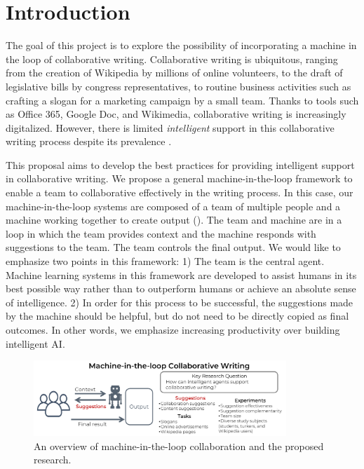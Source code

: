 
\section{Introduction}

The goal of this project is to explore the possibility of incorporating a machine in the loop of collaborative writing.
Collaborative writing is ubiquitous, ranging from the creation of Wikipedia by millions of online volunteers, to the draft of legislative bills by congress representatives, to routine business activities such as crafting a slogan for a marketing campaign by a small team.
Thanks to tools such as Office 365, Google Doc, and Wikimedia, collaborative writing is increasingly digitalized.
However, there is limited {\em intelligent} support in this collaborative writing process despite its prevalence \citep{gehrmann2015deploying}.


This proposal aims to develop the best practices for providing intelligent support in collaborative writing.
We propose a general machine-in-the-loop framework to enable a team to collaborative effectively in the writing process.
In this case, our machine-in-the-loop systems are composed of a team of multiple people and a machine working together to create output (). The team and machine are in a loop in which the team provides context and the machine responds with suggestions to the team. The team controls the final output.
We would like to emphasize two points in this framework:
1)  The team is the central agent. Machine learning systems in this framework are developed to assist humans in its best possible way rather than to outperform humans or achieve an absolute sense of intelligence.
2)  In order for this process to be successful, the suggestions made by the machine should be helpful, but do not need to be directly copied as final outcomes.
In other words, we emphasize increasing productivity over building intelligent AI.

\begin{figure}[t]
\centering
\includegraphics[width=0.85\textwidth]{illustration.pdf}
\caption{An overview of machine-in-the-loop collaboration and the proposed research.}
\label{fig:task}
\end{figure}

